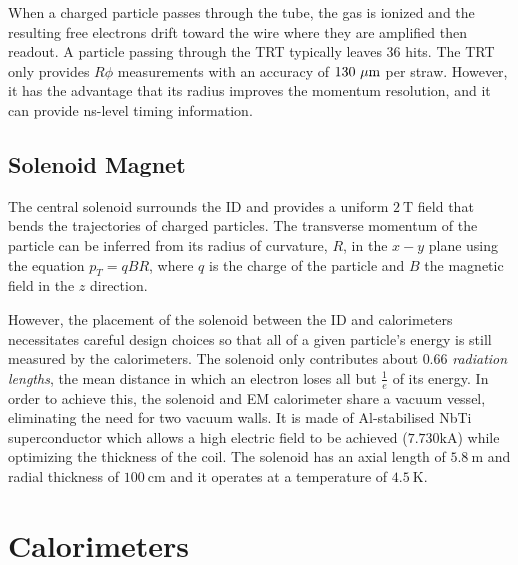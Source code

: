 When a charged particle passes through the tube, the gas is ionized and the resulting free electrons drift toward the wire where they are amplified then readout. A particle passing through the \ac{TRT} typically leaves 36 hits. The \ac{TRT} only provides $R\phi$ measurements with an accuracy of $130~\mu\text{m}$ per straw. However, it has the advantage that its radius improves the momentum resolution, and it  can provide ns-level timing information.


\subsection{Solenoid Magnet}

The central solenoid surrounds the \ac{ID} and provides a uniform $2~\textrm{T}$ field that bends the trajectories of charged particles. The transverse momentum of the particle can be inferred from its radius of curvature, $R$, in the $x-y$ plane using the equation $p_{T} = qBR$, where $q$ is the charge of the particle and $B$ the magnetic field in the $z$ direction.

However, the placement of the solenoid between the \ac{ID} and calorimeters necessitates careful design choices so that all of a given particle's energy is still measured by the calorimeters. The solenoid only contributes about $0.66$ \emph{radiation lengths}, the mean distance in which an electron loses all but $\frac{1}{e}$ of its energy. In order to achieve this, the solenoid and \ac{EM} calorimeter share a vacuum vessel, eliminating the need for two vacuum walls. It is made of Al-stabilised NbTi superconductor which allows a high electric field to be achieved ($7.730 \textrm{kA}$) while optimizing the thickness of the coil. The solenoid has an axial length of $5.8~\textrm{m}$ and radial thickness of $100~ \textrm{cm}$ and it operates at a temperature of $4.5~\textrm{K}$. 


\section{Calorimeters}

